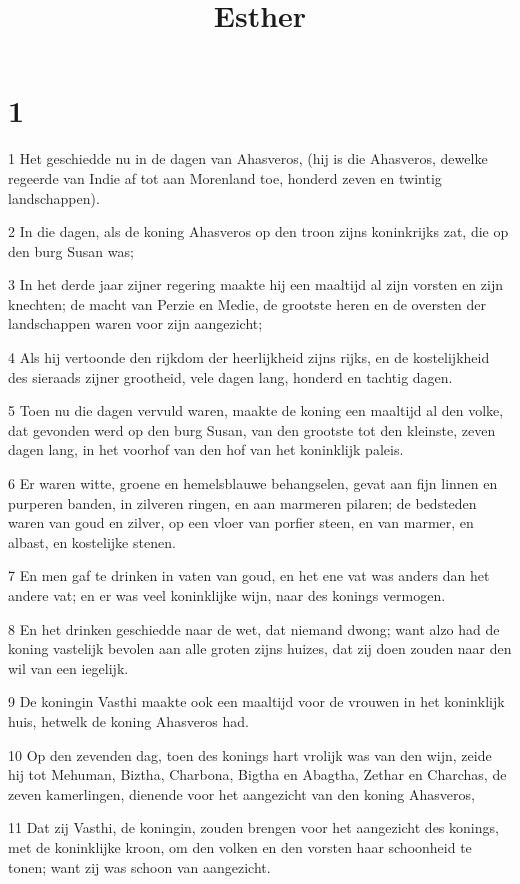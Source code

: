 

\title{Esther}



\chapter{1}

\par 1 Het geschiedde nu in de dagen van Ahasveros, (hij is die Ahasveros, dewelke regeerde van Indie af tot aan Morenland toe, honderd zeven en twintig landschappen).
\par 2 In die dagen, als de koning Ahasveros op den troon zijns koninkrijks zat, die op den burg Susan was;
\par 3 In het derde jaar zijner regering maakte hij een maaltijd al zijn vorsten en zijn knechten; de macht van Perzie en Medie, de grootste heren en de oversten der landschappen waren voor zijn aangezicht;
\par 4 Als hij vertoonde den rijkdom der heerlijkheid zijns rijks, en de kostelijkheid des sieraads zijner grootheid, vele dagen lang, honderd en tachtig dagen.
\par 5 Toen nu die dagen vervuld waren, maakte de koning een maaltijd al den volke, dat gevonden werd op den burg Susan, van den grootste tot den kleinste, zeven dagen lang, in het voorhof van den hof van het koninklijk paleis.
\par 6 Er waren witte, groene en hemelsblauwe behangselen, gevat aan fijn linnen en purperen banden, in zilveren ringen, en aan marmeren pilaren; de bedsteden waren van goud en zilver, op een vloer van porfier steen, en van marmer, en albast, en kostelijke stenen.
\par 7 En men gaf te drinken in vaten van goud, en het ene vat was anders dan het andere vat; en er was veel koninklijke wijn, naar des konings vermogen.
\par 8 En het drinken geschiedde naar de wet, dat niemand dwong; want alzo had de koning vastelijk bevolen aan alle groten zijns huizes, dat zij doen zouden naar den wil van een iegelijk.
\par 9 De koningin Vasthi maakte ook een maaltijd voor de vrouwen in het koninklijk huis, hetwelk de koning Ahasveros had.
\par 10 Op den zevenden dag, toen des konings hart vrolijk was van den wijn, zeide hij tot Mehuman, Biztha, Charbona, Bigtha en Abagtha, Zethar en Charchas, de zeven kamerlingen, dienende voor het aangezicht van den koning Ahasveros,
\par 11 Dat zij Vasthi, de koningin, zouden brengen voor het aangezicht des konings, met de koninklijke kroon, om den volken en den vorsten haar schoonheid te tonen; want zij was schoon van aangezicht.
